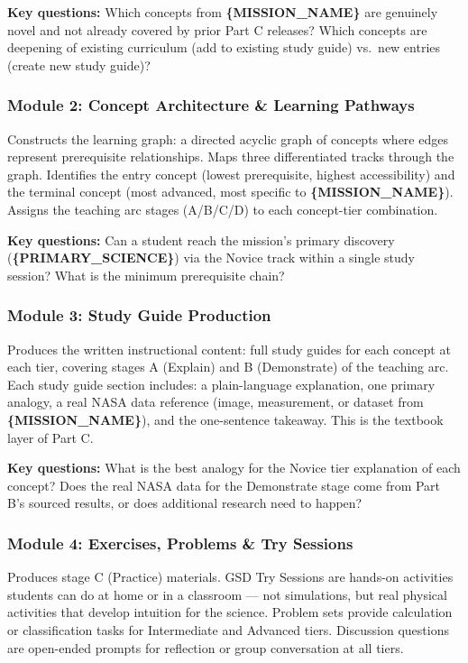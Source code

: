 \documentclass[11pt,letterpaper]{article}
\newcommand{\param}[1]{\textcolor{paramred}{\textbf{\{#1\}}}}
\begin{document}
\textbf{Key questions:} Which concepts from \param{MISSION\_NAME} are genuinely novel and not already covered by prior Part C releases? Which concepts are deepening of existing curriculum (add to existing study guide) vs.\ new entries (create new study guide)?

\subsubsection{Module 2: Concept Architecture \& Learning Pathways}

Constructs the learning graph: a directed acyclic graph of concepts where edges represent prerequisite relationships. Maps three differentiated tracks through the graph. Identifies the entry concept (lowest prerequisite, highest accessibility) and the terminal concept (most advanced, most specific to \param{MISSION\_NAME}). Assigns the teaching arc stages (A/B/C/D) to each concept-tier combination.

\textbf{Key questions:} Can a student reach the mission's primary discovery (\param{PRIMARY\_SCIENCE}) via the Novice track within a single study session? What is the minimum prerequisite chain?

\subsubsection{Module 3: Study Guide Production}

Produces the written instructional content: full study guides for each concept at each tier, covering stages A (Explain) and B (Demonstrate) of the teaching arc. Each study guide section includes: a plain-language explanation, one primary analogy, a real NASA data reference (image, measurement, or dataset from \param{MISSION\_NAME}), and the one-sentence takeaway. This is the textbook layer of Part C.

\textbf{Key questions:} What is the best analogy for the Novice tier explanation of each concept? Does the real NASA data for the Demonstrate stage come from Part B's sourced results, or does additional research need to happen?

\subsubsection{Module 4: Exercises, Problems \& Try Sessions}

Produces stage C (Practice) materials. GSD Try Sessions are hands-on activities students can do at home or in a classroom --- not simulations, but real physical activities that develop intuition for the science. Problem sets provide calculation or classification tasks for Intermediate and Advanced tiers. Discussion questions are open-ended prompts for reflection or group conversation at all tiers.
\end{document}
